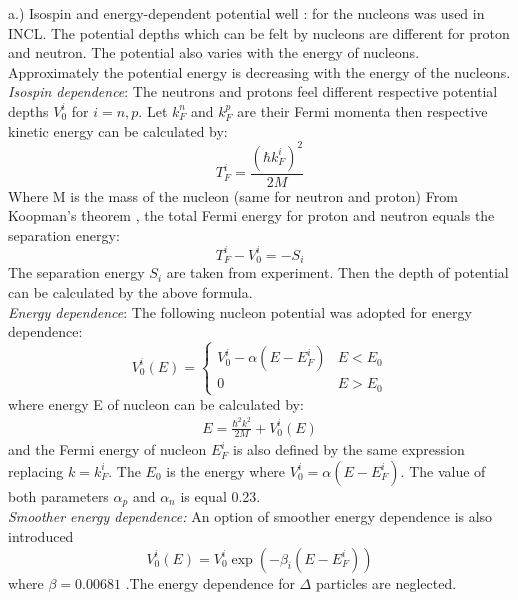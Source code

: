 a.) Isospin and energy-dependent potential well\cite{INCLaoust2004effects} : for the nucleons was used in  INCL\cite{INCLboudard2013new}. The potential depths which can be felt by nucleons are different for proton and neutron. The potential also varies with the energy of nucleons. Approximately the potential energy is decreasing with the energy of the nucleons.\\
\textit{Isospin dependence}: The neutrons and protons feel different respective potential depths $V_0^i$ for $i=n,p$. Let $k_F^n$ and $k_F^p$ are their Fermi momenta then respective kinetic energy can be calculated by:
\begin{equation}\label{FKE}
	T_F^{i}=\frac{(\hbar k_F^i)^2}{2M}
\end{equation}
Where M is the mass of the nucleon (same for neutron and proton)
From Koopman's theorem \cite{KOOPMANS1934104}, the total Fermi energy for proton and neutron  equals the separation energy: 
\begin{equation}
	T_F^{i}-V_0^i=-S_i
\end{equation}
The separation energy $S_i$ are taken from experiment\cite{WAPSTRA198555}. Then the depth of potential can be calculated by the above formula.\\ 
\textit{Energy dependence}: The following nucleon potential was adopted for energy dependence:
\begin{equation}\label{Epoten}
	V_{0}^{i}(E)= \begin{cases} V_{0}^{i}-\alpha\left(E-E_F^{i}\right) &  E<E_{0}\\ 
		0 &  E> E_{0} \end{cases} 
\end{equation}
where energy E of nucleon can be calculated by:
\begin{align}
	E=\frac{\hbar^2k^2}{2M}+V_{0}^{i}(E) \label{energy}
\end{align}
and the Fermi energy of nucleon $E_F^i$ is also defined by the same expression replacing $k=k_F^i$. The $E_0$ is the energy where $V_0^i =\alpha(E-E_F^i)$. The value of both parameters $\alpha_p$  and $\alpha_n$ is equal 0.23.
\\
\textit{Smoother energy dependence:} An option of smoother energy dependence is also introduced
\begin{equation}
	V_{0}^{i}(E)= V_{0}^{i}\exp\left(-\beta_i\left(E-E_F^i\right)\right)
\end{equation}
where $\beta=0.00681$ \cite{INCLboudard2004new} .The energy dependence for $\Delta$ particles are neglected.
